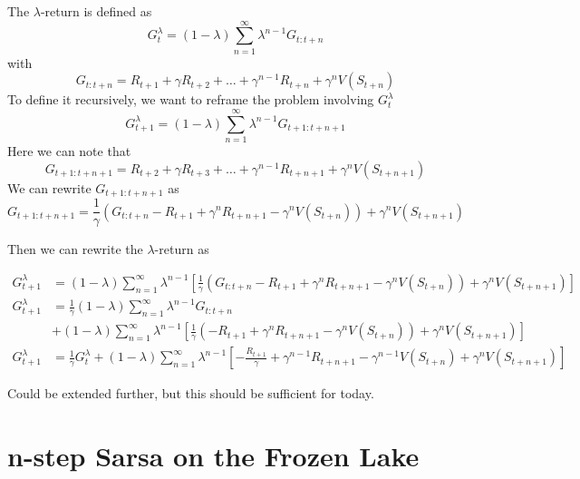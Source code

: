 \documentclass{article}
\begin{document}
The $\lambda$-return is defined as
\begin{equation}
    G_{t}^{\lambda} = (1-\lambda)\sum_{n=1}^{\infty}\lambda^{n-1}G_{t:t+n}
\end{equation}
with
\begin{equation}
    G_{t:t+n} = R_{t+1} + \gamma R_{t+2} + \ldots + \gamma^{n-1}R_{t+n} + \gamma^{n}V(S_{t+n})
\end{equation}
To define it recursively, we want to reframe the problem involving $G_t^{\lambda}$
\begin{equation}
    G_{t+1}^{\lambda} = (1-\lambda)\sum_{n=1}^{\infty}\lambda^{n-1}G_{t+1:t+n+1}
\end{equation}
Here we can note that
\begin{equation}
    G_{t+1:t+n+1} = R_{t+2} + \gamma R_{t+3} + \ldots + \gamma^{n-1}R_{t+n+1} + \gamma^{n}V(S_{t+n+1})
\end{equation}
We can rewrite $G_{t+1:t+n+1}$ as
\begin{equation}
    G_{t+1:t+n+1} = \frac{1}{\gamma}\left(G_{t:t+n} - R_{t+1} + \gamma^{n} R_{t+n+1} -\gamma^n V(S_{t+n})\right)+ \gamma^{n}V(S_{t+n+1})
\end{equation}

Then we can rewrite the $\lambda$-return as

\begin{align*}
    G_{t+1}^{\lambda} &= (1-\lambda)\sum_{n=1}^{\infty}\lambda^{n-1} \left[ \frac{1}{\gamma}\left(G_{t:t+n} - R_{t+1} + \gamma^{n} R_{t+n+1} -\gamma^n V(S_{t+n})\right) + \gamma^{n}V(S_{t+n+1}) \right] \\
    G_{t+1}^{\lambda} &= \frac{1}{\gamma}(1-\lambda)\sum_{n=1}^{\infty}\lambda^{n-1}G_{t:t+n}
    \\ &+ (1-\lambda)\sum_{n=1}^{\infty}\lambda^{n-1} \left[ \frac{1}{\gamma}\left(- R_{t+1} + \gamma^{n} R_{t+n+1} -\gamma^n V(S_{t+n})\right) + \gamma^{n}V(S_{t+n+1}) \right] \\
    G_{t+1}^{\lambda} &= \frac{1}{\gamma} G_t^{\lambda}+ (1-\lambda)\sum_{n=1}^{\infty}\lambda^{n-1} \left[ -\frac{R_{t+1}}{\gamma} + \gamma^{n-1} R_{t+n+1} -\gamma^{n-1} V(S_{t+n}) + \gamma^{n}V(S_{t+n+1}) \right]
\end{align*}

Could be extended further, but this should be sufficient for today.


\section{n-step Sarsa on the Frozen Lake}
\end{document}

